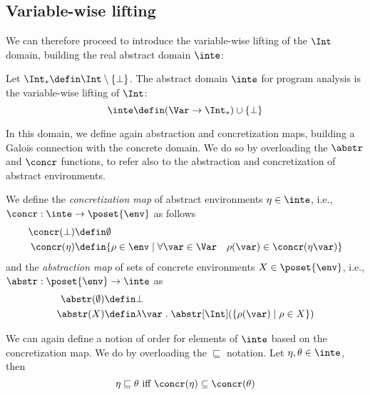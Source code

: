 \subsection{Variable-wise lifting}
\label{sub:vwintervals}

We can therefore proceed to introduce the variable-wise lifting of the
\(\Int\) domain, building the real abstract domain \(\inte\):

\begin{definition}
  Let \(\Int_* \defin \Int \setminus \{\bot\}\). The abstract domain
  \(\inte\) for program analysis is the variable-wise lifting of
  \(\Int\):
  \[ \inte \defin (\Var \to \Int_*) \cup \{ \bot \} \]
\end{definition}

In this domain, we define again abstraction and concretization maps,
building a Galois connection with the concrete domain. We do so by
overloading the \(\abstr\) and \(\concr\) functions, to refer also to
the abstraction and concretization of abstract environments.

\begin{definition}
  \label{def:vwabstr}
  We define the \emph{concretization map} of abstract environments
  \(\eta \in \inte\), i.e., \(\concr : \inte \to \poset{\env}\) as
  follows
  \begin{align*}
    \concr(\bot) & \defin \emptyset \\
    \concr(\eta) & \defin \{\rho \in \env \mid \forall \var \in \Var \quad \rho(\var) \in \concr(\eta\var)\}
  \end{align*}
  and the \emph{abstraction map} of sets of concrete environments
  \(X \in \poset{\env}\), i.e., \(\abstr : \poset{\env} \to \inte\) as
  \begin{align*}
    \abstr(\emptyset) & \defin \bot \\
    \abstr(X) & \defin \lambda \var \; . \; \abstr[\Int](\{\rho(\var) \mid \rho \in X\}) \\
  \end{align*}
\end{definition}

We can again define a notion of order for elements of \(\inte\) based
on the concretization map. We do by overloading the 
\(\sqsubseteq\) notation. Let \(\eta, \theta \in \inte\), then
\begin{equation*}
  \eta \sqsubseteq \theta \text{ iff } \concr(\eta) \subseteq \concr(\theta)
\end{equation*}

